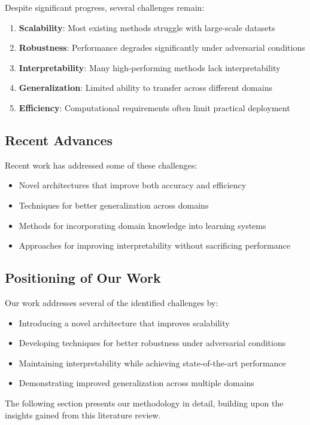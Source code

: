 Despite significant progress, several challenges remain:

\begin{enumerate}
    \item \textbf{Scalability}: Most existing methods struggle with large-scale datasets
    \item \textbf{Robustness}: Performance degrades significantly under adversarial conditions
    \item \textbf{Interpretability}: Many high-performing methods lack interpretability
    \item \textbf{Generalization}: Limited ability to transfer across different domains
    \item \textbf{Efficiency}: Computational requirements often limit practical deployment
\end{enumerate}

\subsection{Recent Advances}

Recent work has addressed some of these challenges:

\begin{itemize}
    \item Novel architectures that improve both accuracy and efficiency
    \item Techniques for better generalization across domains
    \item Methods for incorporating domain knowledge into learning systems
    \item Approaches for improving interpretability without sacrificing performance
\end{itemize}

\subsection{Positioning of Our Work}

Our work addresses several of the identified challenges by:

\begin{itemize}
    \item Introducing a novel architecture that improves scalability
    \item Developing techniques for better robustness under adversarial conditions
    \item Maintaining interpretability while achieving state-of-the-art performance
    \item Demonstrating improved generalization across multiple domains
\end{itemize}

The following section presents our methodology in detail, building upon the insights gained from this literature review.
